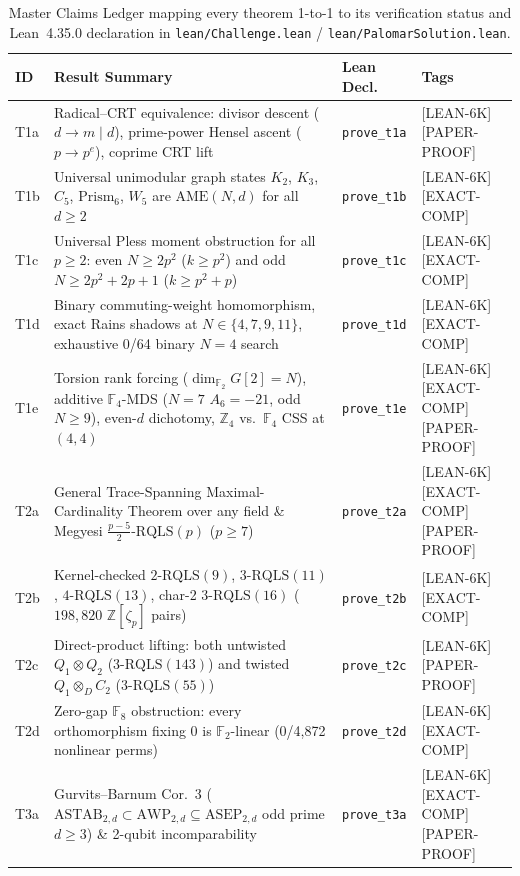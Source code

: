 \documentclass[11pt,reqno]{amsart}
\theoremstyle{definition}
\newcommand{\ZZ}{\mathbb{Z}}
\newcommand{\FF}{\mathbb{F}}
\newcommand{\AME}{\mathrm{AME}}
\newcommand{\RQLS}{\mathrm{RQLS}}
\newcommand{\ASTAB}{\mathrm{ASTAB}}
\newcommand{\AWP}{\mathrm{AWP}}
\newcommand{\ASEP}{\mathrm{ASEP}}
\newcommand{\lid}[1]{{\footnotesize\nolinkurl{#1}}}
\newcommand{\tagL}{\textsf{\footnotesize[LEAN-6K]}}
\newcommand{\tagE}{\textsf{\footnotesize[EXACT-COMP]}}
\newcommand{\tagP}{\textsf{\footnotesize[PAPER-PROOF]}}
\begin{document}
\begin{table}[htbp]
\centering
\caption{Master Claims Ledger mapping every theorem 1-to-1 to its verification status
and Lean~4.35.0 declaration in \lid{lean/Challenge.lean} / \lid{lean/PalomarSolution.lean}.}
\label{tab:claims-ledger}
\scriptsize
\setlength{\tabcolsep}{3.5pt}
\begin{tabularx}{\textwidth}{@{}l >{\raggedright\arraybackslash}X l l@{}}
\toprule
\textbf{ID} & \textbf{Result Summary} & \textbf{Lean Decl.} & \textbf{Tags} \\
\midrule
T1a & Radical--CRT equivalence: divisor descent ($d \to m \mid d$), prime-power Hensel ascent ($p \to p^e$), coprime CRT lift & \lid{prove_t1a} & \tagL\,\tagP \\
T1b & Universal unimodular graph states $K_2$, $K_3$, $C_5$, $\mathrm{Prism}_6$, $W_5$ are $\AME(N,d)$ for all $d \ge 2$ & \lid{prove_t1b} & \tagL\,\tagE \\
T1c & Universal Pless moment obstruction for all $p \ge 2$: even $N \ge 2p^2$ ($k \ge p^2$) and odd $N \ge 2p^2+2p+1$ ($k \ge p^2+p$) & \lid{prove_t1c} & \tagL\,\tagE \\
T1d & Binary commuting-weight homomorphism, exact Rains shadows at $N \in \{4,7,9,11\}$, exhaustive 0/64 binary $N=4$ search & \lid{prove_t1d} & \tagL\,\tagE \\
T1e & Torsion rank forcing ($\dim_{\FF_2} G[2]=N$), additive $\FF_4$-MDS ($N=7$ $A_6=-21$, odd $N\ge 9$), even-$d$ dichotomy, $\ZZ_4$ vs.\ $\FF_4$ CSS at $(4,4)$ & \lid{prove_t1e} & \tagL\,\tagE\,\tagP \\
\addlinespace
T2a & General Trace-Spanning Maximal-Cardinality Theorem over any field \& Megyesi $\frac{p-5}{2}$-$\RQLS(p)$ ($p \ge 7$) & \lid{prove_t2a} & \tagL\,\tagE\,\tagP \\
T2b & Kernel-checked $2$-$\RQLS(9)$, $3$-$\RQLS(11)$, $4$-$\RQLS(13)$, char-2 $3$-$\RQLS(16)$ ($198{,}820$ $\ZZ[\zeta_p]$ pairs) & \lid{prove_t2b} & \tagL\,\tagE \\
T2c & Direct-product lifting: both untwisted $Q_1 \otimes Q_2$ ($3$-$\RQLS(143)$) and twisted $Q_1 \otimes_D C_2$ ($3$-$\RQLS(55)$) & \lid{prove_t2c} & \tagL\,\tagP \\
T2d & Zero-gap $\FF_8$ obstruction: every orthomorphism fixing $0$ is $\FF_2$-linear (0/4,872 nonlinear perms) & \lid{prove_t2d} & \tagL\,\tagE \\
\addlinespace
T3a & Gurvits--Barnum Cor.~3 ($\ASTAB_{2,d} \subset \AWP_{2,d} \subseteq \ASEP_{2,d}$ odd prime $d \ge 3$) \& 2-qubit incomparability & \lid{prove_t3a} & \tagL\,\tagE\,\tagP \\

\end{tabularx}
\end{table}
\end{document}
